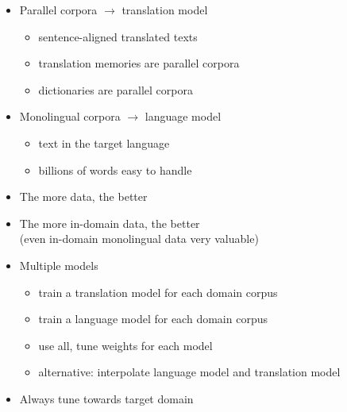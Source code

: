 \documentclass[landscape]{uedslides2C}
\begin{document}

\vspace{15mm}
\begin{itemize}
\item Parallel corpora $\rightarrow$ translation model
\begin{itemize}
\item sentence-aligned translated texts
\item translation memories are parallel corpora
\item dictionaries are parallel corpora
\end{itemize}
\item Monolingual corpora $\rightarrow$ language model
\begin{itemize}
\item text in the target language
\item billions of words easy to handle
\end{itemize}
\end{itemize}


\vspace{10mm}
\begin{itemize}
\item The more data, the better
\item The more in-domain data, the better\\
(even in-domain monolingual data very valuable)
\item Multiple models 
\begin{itemize}
\item train a translation model for each domain corpus
\item train a language model for each domain corpus
\item use all, tune weights for each model
\item alternative: interpolate language model and translation model
\end{itemize}
\item Always tune towards target domain
\end{itemize}

\end{document}
